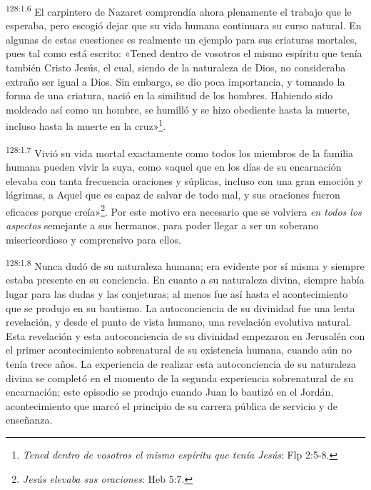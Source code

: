\par
\textsuperscript{128:1.6} El carpintero de Nazaret comprendía ahora plenamente el trabajo que le esperaba, pero escogió dejar que su vida humana continuara su curso natural. En algunas de estas cuestiones es realmente un ejemplo para sus criaturas mortales, pues tal como está escrito: «Tened dentro de vosotros el mismo espíritu que tenía también Cristo Jesús, el cual, siendo de la naturaleza de Dios, no consideraba extraño ser igual a Dios. Sin embargo, se dio poca importancia, y tomando la forma de una criatura, nació en la similitud de los hombres. Habiendo sido moldeado así como un hombre, se humilló y se hizo obediente hasta la muerte, incluso hasta la muerte en la cruz»\footnote{\textit{Tened dentro de vosotros el mismo espíritu que tenía Jesús}: Flp 2:5-8.}.

\par
\textsuperscript{128:1.7} Vivió su vida mortal exactamente como todos los miembros de la familia humana pueden vivir la suya, como «aquel que en los días de su encarnación elevaba con tanta frecuencia oraciones y súplicas, incluso con una gran emoción y lágrimas, a Aquel que es capaz de salvar de todo mal, y sus oraciones fueron eficaces porque creía»\footnote{\textit{Jesús elevaba sus oraciones}: Heb 5:7.}. Por este motivo era necesario que se volviera \textit{en todos los aspectos} semejante a sus hermanos, para poder llegar a ser un soberano misericordioso y comprensivo para ellos.

\par
\textsuperscript{128:1.8} Nunca dudó de su naturaleza humana; era evidente por sí misma y siempre estaba presente en su conciencia. En cuanto a su naturaleza divina, siempre había lugar para las dudas y las conjeturas; al menos fue así hasta el acontecimiento que se produjo en su bautismo. La autoconciencia de su divinidad fue una lenta revelación, y desde el punto de vista humano, una revelación evolutiva natural. Esta revelación y esta autoconciencia de su divinidad empezaron en Jerusalén con el primer acontecimiento sobrenatural de su existencia humana, cuando aún no tenía trece años. La experiencia de realizar esta autoconciencia de su naturaleza divina se completó en el momento de la segunda experiencia sobrenatural de su encarnación; este episodio se produjo cuando Juan lo bautizó en el Jordán, acontecimiento que marcó el principio de su carrera pública de servicio y de enseñanza.

